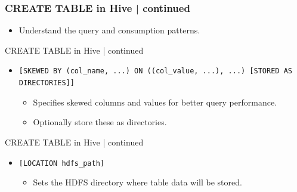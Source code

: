\begin{frame}[fragile]
\frametitle{CREATE TABLE in Hive | continued}    
\vspace{-0.5cm}		
\begin{tcolorbox}[colback=white,colframe=black,title= Part 6: Clustering and Sorting | Conclusion]
		\begin{itemize}
			\item Understand the query and consumption patterns.
		\end{itemize}
\end{tcolorbox}
\end{frame}

  \begin{frame}{CREATE TABLE in Hive | continued}
	\begin{tcolorbox}[colback=white,colframe=black,title= Part 7: Data Skewing]
		\small
	\begin{itemize}
	  \item \texttt{[SKEWED BY (col\_name, ...) ON ((col\_value, ...), ...) [STORED AS DIRECTORIES]]}
	  \begin{itemize}
		\item Specifies skewed columns and values for better query performance.
		\item Optionally store these as directories.
	  \end{itemize}
	\end{itemize}
	\end{tcolorbox}
  \end{frame}
  

  
  \begin{frame}{CREATE TABLE in Hive | continued}
	\begin{tcolorbox}[colback=white,colframe=black,title= Part 8: Table Location]
		\small
	\begin{itemize}
	  \item \texttt{[LOCATION hdfs\_path]}
	  \begin{itemize}
		\item Sets the HDFS directory where table data will be stored.
	  \end{itemize}
	\end{itemize}
	\end{tcolorbox}	
  \end{frame}
  
